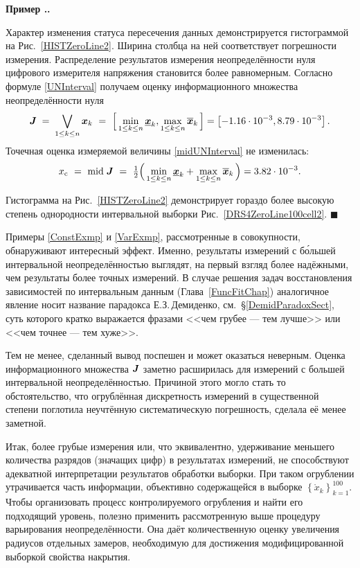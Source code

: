 \documentclass[a5paper,openany]{book}
\newcommand{\mbf}[1]{\protect\text{\boldmath$#1$}}
\newcommand{\ov}{\overline}
\newcommand{\un}{\underline}
\newcommand{\m}{\mathrm{mid}\;}
\newcounter{ExmpNum}[section]
\renewcommand{\theExmpNum}{\thesection.\arabic{ExmpNum}}
\newenvironment{example}%
  {\refstepcounter{ExmpNum}%
  \par\addvspace{\medskipamount} 
  \noindent\textbf{Пример {\theExmpNum}.}
  }%
  {\hfill$\blacksquare$\par\medskip}
\begin{document}
\begin{example}
  
Характер изменения статуса пересечения данных демонстрируется гистограммой 
на Рис.~\ref{HISTZeroLine2}. Ширина столбца на ней соответствует погрешности 
измерения. Распределение результатов измерения неопределённости нуля цифрового 
измерителя напряжения становится более равномерным. Согласно формуле 
\eqref{UNInterval} получаем оценку информационного множества неопределённости нуля 
\begin{equation*} 
\mbf{J}\; = \;\bigvee_{1\leq k\leq n} \mbf{x}_{k} \ 
= \  \Bigl[\,\min_{1\leq k\leq n} \un{\mbf{x}}_{k}, 
  \max_{1\leq k\leq n} \ov{\mbf{x}}_{k}\,\Bigr] 
= \left[ -1.16 \cdot 10^{-3}, 8.79 \cdot 10^{-3} \right]. 
\end{equation*} 
Точечная оценка измеряемой величины \eqref{midUNInterval} не изменилась:
\begin{equation*}
x_\text{c} \  = \  \m\mbf{J} \   
= \  \tfrac{1}{2} \Bigl(\,\min_{1\leq k\leq n} \un{\mbf{x}}_{k} + 
\max_{1\leq k\leq n} \ov{\mbf{x}}_{k}\,\Bigr) = 3.82 \cdot 10^{-3}. 
\end{equation*} 
  
Гистограмма на Рис.~\ref{HISTZeroLine2} демонстрирует гораздо более высокую степень 
однородности интервальной выборки Рис.~\ref{DRS4ZeroLine100cell2}.   
\end{example} 
  
Примеры \ref{ConstExmp} и \ref{VarExmp}, рассмотренные в совокупности, обнаруживают 
интересный эффект. Именно, результаты измерений с б\'{о}льшей интервальной 
неопределённостью выглядят, на первый взгляд более надёжными, чем результаты более 
точных измерений. В случае решения задач восстановления зависимостей по интервальным 
данным (Глава~\ref{FuncFitChap}) аналогичное явление носит название парадокса 
Е.З.\,Демиденко, см.~\S\ref{DemidParadoxSect},\index{парадокс Демиденко} суть 
которого кратко выражается фразами <<чем грубее --- тем лучше>> 
или <<чем точнее --- тем хуже>>.  
  
Тем не менее, сделанный вывод поспешен и может оказаться неверным. Оценка 
информационного множества $\mbf{J}$ заметно расширилась для измерений с большей 
интервальной неопределённостью. Причиной этого могло стать то обстоятельство, 
что огрублённая дискретность измерений в существенной степени поглотила неучтённую 
систематическую погрешность, сделала её менее заметной. 
  
Итак, более грубые измерения или, что эквивалентно, удерживание меньшего количества 
разрядов (значащих цифр) в результатах измерений, не способствуют адекватной 
интерпретации результатов обработки выборки. При таком огрублении утрачивается часть 
информации, объективно содержащейся в выборке $\left\{\mathring{x}_k\right\}_{k=1}^{100}$. 
Чтобы организовать процесс контролируемого огрубления и найти его подходящий уровень, 
полезно применить рассмотренную выше процедуру варьирования неопределённости. 
Она даёт количественную оценку увеличения радиусов отдельных замеров, необходимую 
для достижения модифицированной выборкой свойства накрытия.  
  
\end{document}
